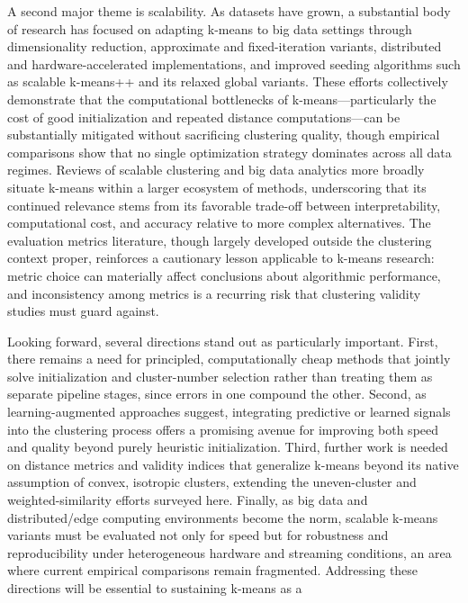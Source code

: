A second major theme is scalability. As datasets have grown, a substantial body of research has focused on adapting k-means to big data settings through dimensionality reduction, approximate and fixed-iteration variants, distributed and hardware-accelerated implementations, and improved seeding algorithms such as scalable k-means++ and its relaxed global variants. These efforts collectively demonstrate that the computational bottlenecks of k-means---particularly the cost of good initialization and repeated distance computations---can be substantially mitigated without sacrificing clustering quality, though empirical comparisons show that no single optimization strategy dominates across all data regimes. Reviews of scalable clustering and big data analytics more broadly situate k-means within a larger ecosystem of methods, underscoring that its continued relevance stems from its favorable trade-off between interpretability, computational cost, and accuracy relative to more complex alternatives. The evaluation metrics literature, though largely developed outside the clustering context proper, reinforces a cautionary lesson applicable to k-means research: metric choice can materially affect conclusions about algorithmic performance, and inconsistency among metrics is a recurring risk that clustering validity studies must guard against.

Looking forward, several directions stand out as particularly important. First, there remains a need for principled, computationally cheap methods that jointly solve initialization and cluster-number selection rather than treating them as separate pipeline stages, since errors in one compound the other. Second, as learning-augmented approaches suggest, integrating predictive or learned signals into the clustering process offers a promising avenue for improving both speed and quality beyond purely heuristic initialization. Third, further work is needed on distance metrics and validity indices that generalize k-means beyond its native assumption of convex, isotropic clusters, extending the uneven-cluster and weighted-similarity efforts surveyed here. Finally, as big data and distributed/edge computing environments become the norm, scalable k-means variants must be evaluated not only for speed but for robustness and reproducibility under heterogeneous hardware and streaming conditions, an area where current empirical comparisons remain fragmented. Addressing these directions will be essential to sustaining k-means as a




